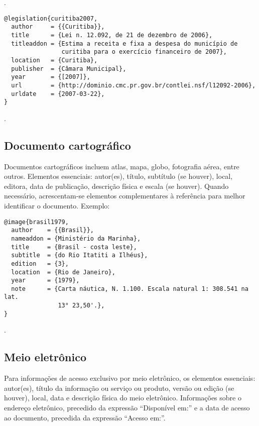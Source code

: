 \noindent
{}.

\vspace*{1em}

\begin{verbatim}
@legislation{curitiba2007,
  author     = {{Curitiba}},
  title      = {Lei n. 12.092, de 21 de dezembro de 2006},
  titleaddon = {Estima a receita e fixa a despesa do município de
                curitiba para o exercício financeiro de 2007},
  location   = {Curitiba},
  publisher  = {Câmara Municipal},
  year       = {[2007]},
  url        = {http://dominio.cmc.pr.gov.br/contlei.nsf/l12092-2006},
  urldate    = {2007-03-22},
}
\end{verbatim}

\noindent
{}.

\subsection{Documento cartográfico}

Documentos cartográficos incluem atlas, mapa, globo, fotografia aérea, entre outros.
Elementos essenciais: autor(es), título, subtítulo (se houver), local, editora, data de publicação, descrição física e escala (se houver). Quando necessário, acrescentam-se elementos complementares à referência para melhor identificar o documento.
Exemplo:

\vspace*{1em}

\begin{verbatim}
@image{brasil1979,
  author    = {{Brasil}},
  nameaddon = {Ministério da Marinha},
  title     = {Brasil - costa leste},
  subtitle  = {do Rio Itatiti a Ilhéus},
  edition   = {3},
  location  = {Rio de Janeiro},
  year      = {1979},
  note      = {Carta náutica, N. 1.100. Escala natural 1: 308.541 na lat.
               13° 23,50'.},
}
\end{verbatim}

\noindent
{}.

\subsection{Meio eletrônico}

Para informações de acesso exclusivo por meio eletrônico, os elementos essenciais: autor(es), título da informação ou serviço ou produto, versão ou edição (se houver), local, data e descrição física do meio eletrônico. Informações sobre o endereço eletrônico, precedido da expressão ``Disponível em:'' e a data de acesso ao documento, precedida da expressão ``Acesso em:''.

